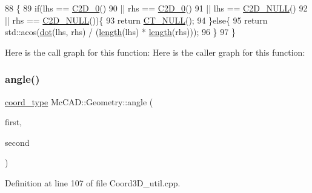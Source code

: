 \begin{DoxyCode}
88                            \{
89     \textcolor{keywordflow}{if}(lhs == \hyperlink{namespaceMcCAD_1_1Geometry_a1839f640b92275bf5245e918fa8a2137}{C2D\_0}()
90             || rhs == \hyperlink{namespaceMcCAD_1_1Geometry_a1839f640b92275bf5245e918fa8a2137}{C2D\_0}()
91             || lhs == \hyperlink{namespaceMcCAD_1_1Geometry_a14ff5fd2db066e4dfad0a638f03762a2}{C2D\_NULL}()
92             || rhs == \hyperlink{namespaceMcCAD_1_1Geometry_a14ff5fd2db066e4dfad0a638f03762a2}{C2D\_NULL}())\{
93         \textcolor{keywordflow}{return} \hyperlink{namespaceMcCAD_1_1Geometry_a7a1a1f1e3e0547cde4d81dec1a126c28}{CT\_NULL}();
94     \}\textcolor{keywordflow}{else}\{
95         \textcolor{keywordflow}{return} std::acos(\hyperlink{namespaceMcCAD_1_1Geometry_a3115a59f432b3fc11f4bac6ee17d979b}{dot}(lhs, rhs) / (\hyperlink{namespaceMcCAD_1_1Geometry_ad2997914c766f1fc561cdd30032b6777}{length}(lhs) * \hyperlink{namespaceMcCAD_1_1Geometry_ad2997914c766f1fc561cdd30032b6777}{length}(rhs)));
96     \}
97 \}
\end{DoxyCode}
Here is the call graph for this function\+:
Here is the caller graph for this function\+:
\mbox{\label{namespaceMcCAD_1_1Geometry_a7b2e709dc661de3cbf3508f10ddcc6db}} 
\subsubsection{\texorpdfstring{angle()}{angle()}\hspace{0.1cm}{\footnotesize\ttfamily [2/2]}}
{\footnotesize\ttfamily \hyperlink{namespaceMcCAD_1_1Geometry_ac043b37a4a7e849fca22869e1982d2f8}{coord\+\_\+type} Mc\+C\+A\+D\+::\+Geometry\+::angle (\begin{DoxyParamCaption}\item[{const \hyperlink{classMcCAD_1_1Geometry_1_1Coord3D}{Coord3D} \&}]{first,  }\item[{const \hyperlink{classMcCAD_1_1Geometry_1_1Coord3D}{Coord3D} \&}]{second }\end{DoxyParamCaption})}



Definition at line 107 of file Coord3\+D\+\_\+util.\+cpp.


